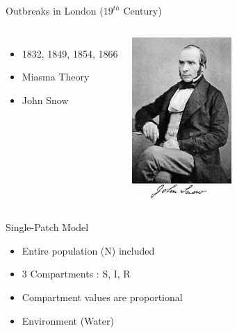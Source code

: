 \documentclass{beamer}\usepackage[]{graphicx}\usepackage[]{color}
\begin{document}
\begin{frame}{Outbreaks in London ($19^{th}$ Century)}
\begin{columns}[onlytextwidth]
\begin{itemize}
\setlength\itemsep{2em}
\item 1832, 1849, 1854, 1866
\item Miasma Theory
\item John Snow  
\end{itemize}
\includegraphics[width=0.65\textwidth]{Snow.jpg}
\end{columns}
\end{frame}

\begin{frame}{Single-Patch Model}
\begin{itemize}
\setlength\itemsep{2em}
\item Entire population (N) included
\item 3 Compartments : S, I, R
\item Compartment values are proportional
\item Environment (Water)
\end{itemize}
\end{frame}
\end{document}

